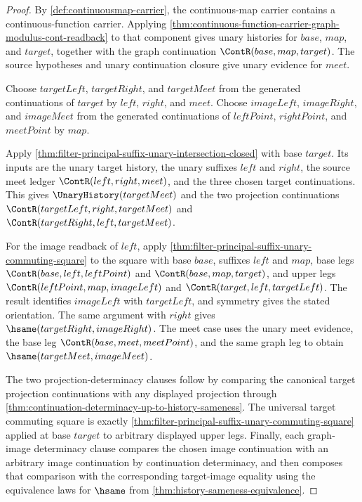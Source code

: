 \begin{proof}
By \autoref{def:continuousmap-carrier}, the continuous-map carrier contains a
continuous-function carrier. Applying
\autoref{thm:continuous-function-carrier-graph-modulus-cont-readback} to that
component gives unary histories for $base$, $map$, and $target$, together with
the graph continuation $\ContR(base,map,target)$. The source hypotheses and
unary continuation closure give unary evidence for $meet$.

Choose $targetLeft$, $targetRight$, and $targetMeet$ from the generated
continuations of $target$ by $left$, $right$, and $meet$. Choose $imageLeft$,
$imageRight$, and $imageMeet$ from the generated continuations of $leftPoint$,
$rightPoint$, and $meetPoint$ by $map$.

Apply \autoref{thm:filter-principal-suffix-unary-intersection-closed} with
base $target$. Its inputs are the unary target history, the unary suffixes
$left$ and $right$, the source meet ledger $\ContR(left,right,meet)$, and the
three chosen target continuations. This gives $\UnaryHistory(targetMeet)$ and
the two projection continuations
$\ContR(targetLeft,right,targetMeet)$ and
$\ContR(targetRight,left,targetMeet)$.

For the image readback of $left$, apply
\autoref{thm:filter-principal-suffix-unary-commuting-square} to the square with
base $base$, suffixes $left$ and $map$, base legs
$\ContR(base,left,leftPoint)$ and $\ContR(base,map,target)$, and upper legs
$\ContR(leftPoint,map,imageLeft)$ and $\ContR(target,left,targetLeft)$. The
result identifies $imageLeft$ with $targetLeft$, and symmetry gives the stated
orientation. The same argument with $right$ gives
$\hsame(targetRight,imageRight)$. The meet case uses the unary meet evidence,
the base leg $\ContR(base,meet,meetPoint)$, and the same graph leg to obtain
$\hsame(targetMeet,imageMeet)$.

The two projection-determinacy clauses follow by comparing the canonical target
projection continuations with any displayed projection through
\autoref{thm:continuation-determinacy-up-to-history-sameness}. The universal
target commuting square is exactly
\autoref{thm:filter-principal-suffix-unary-commuting-square} applied at base
$target$ to arbitrary displayed upper legs. Finally, each graph-image
determinacy clause compares the chosen image continuation with an arbitrary
image continuation by continuation determinacy, and then composes that
comparison with the corresponding target-image equality using the equivalence
laws for $\hsame$ from \autoref{thm:history-sameness-equivalence}.
\end{proof}


